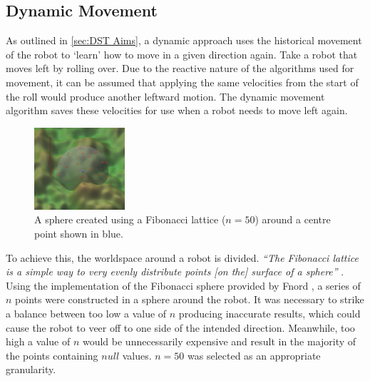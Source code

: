 \documentclass{article}
\begin{document}
\subsection{Dynamic Movement}
\label{sec:DST Imp}
As outlined in \ref{sec:DST Aims}, a dynamic approach uses the historical movement of the robot to ‘learn’ how to move in a given direction again. 
Take a robot that moves left by rolling over. Due to the reactive nature of the algorithms used for movement, it can be assumed that applying the same velocities from the start of the roll would produce another leftward motion. The dynamic movement algorithm saves these velocities for use when a robot needs to move left again. \\
\begin{figure}
    \centering
    \vspace*{-5mm}
    \includegraphics[width=0.3\textwidth]{spherePoints}
    \vspace*{-7mm}
    \caption{A sphere created using a Fibonacci lattice ($n=50$) around a centre point shown in blue.}
\end{figure}
To achieve this, the worldspace around a robot is divided. \textit{“The Fibonacci lattice is a simple way to very evenly distribute points [on the] surface of a sphere”} . Using the implementation of the Fibonacci sphere provided by Fnord , a series of $n$ points were constructed in a sphere around the robot. It was necessary to strike a balance between too low a value of $n$ producing inaccurate results, which could cause the robot to veer off to one side of the intended direction. Meanwhile, too high a value of $n$ would be unnecessarily expensive and result in the majority of the points containing $null$ values. $n=50$ was selected as an appropriate granularity.\\
\end{document}
